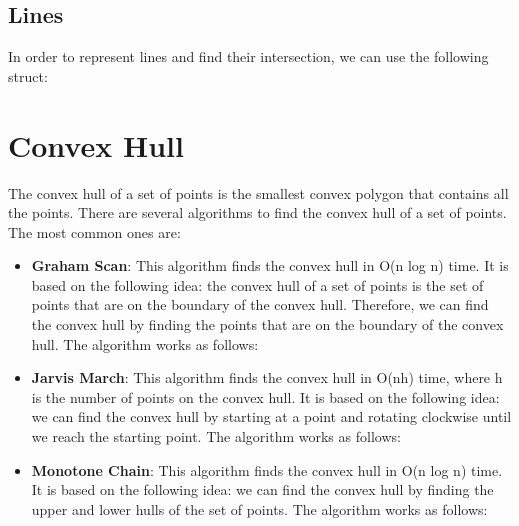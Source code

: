 


\subsection{Lines}

In order to represent lines and find their intersection, we can use the following struct:




\section{Convex Hull}

The convex hull of a set of points is the smallest convex polygon that contains all the points. There are several algorithms to find the convex hull of a set of points. The most common ones are:

\begin{itemize}
    \item \textbf{Graham Scan}: This algorithm finds the convex hull in O(n log n) time. It is based on the following idea: the convex hull of a set of points is the set of points that are on the boundary of the convex hull. Therefore, we can find the convex hull by finding the points that are on the boundary of the convex hull. The algorithm works as follows:
    
    \item \textbf{Jarvis March}: This algorithm finds the convex hull in O(nh) time, where h is the number of points on the convex hull. It is based on the following idea: we can find the convex hull by starting at a point and rotating clockwise until we reach the starting point. The algorithm works as follows:
    \item \textbf{Monotone Chain}: This algorithm finds the convex hull in O(n log n) time. It is based on the following idea: we can find the convex hull by finding the upper and lower hulls of the set of points. The algorithm works as follows:
    
\end{itemize}




